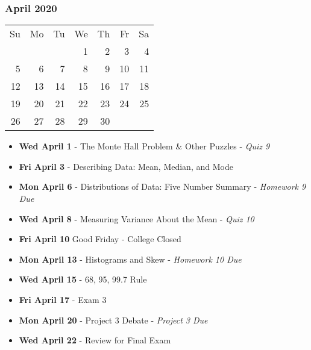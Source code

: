 \subsubsection*{April 2020}
\begin{tabular}{rrrrrrr}
Su & Mo & Tu & We & Th & Fr & Sa\\
   &    &    &  1 &  2 &  3 &  4\\
 5 &  6 &  7 &  8 &  9 & 10 & 11\\
12 & 13 & 14 & 15 & 16 & 17 & 18\\
19 & 20 & 21 & 22 & 23 & 24 & 25\\ 
26 & 27 & 28 & 29 & 30 &    &\\ 
\end{tabular}
\begin{itemize}
\item\textbf{Wed April  1}
  - The Monte Hall Problem \& Other Puzzles - {\em Quiz 9}
\item\textbf{Fri April  3}
  - Describing Data: Mean, Median, and Mode 
\item\textbf{Mon April  6}
  - Distributions of Data: Five Number Summary - {\em Homework 9 Due}
\item\textbf{Wed April  8}
  - Measuring Variance About the Mean - {\em Quiz 10}
\item\textbf{Fri April 10} Good Friday - College Closed
\item\textbf{Mon April 13}
  - Histograms and Skew  - {\em Homework 10 Due}
\item\textbf{Wed April 15}
  - 68, 95, 99.7 Rule 
\item\textbf{Fri April 17}
  - Exam 3
\item\textbf{Mon April 20}
  - Project 3 Debate - {\em Project 3 Due}
\item\textbf{Wed April 22}
  - Review for Final Exam
\end{itemize}
\hrulefill
